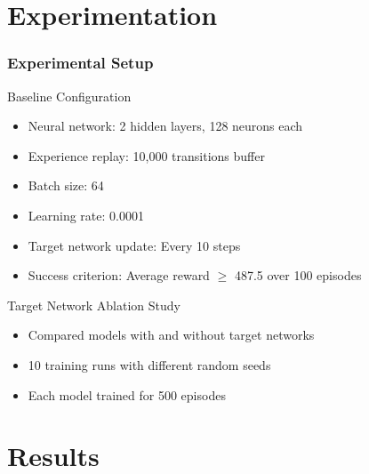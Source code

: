 \documentclass[
    9pt,
    aspectratio=169,
]{beamer}
\begin{document}
\section{Experimentation}

\begin{frame}
\frametitle{Experimental Setup}
\begin{block}{Baseline Configuration}
    \begin{itemize}
        \item Neural network: 2 hidden layers, 128 neurons each
        \item Experience replay: 10,000 transitions buffer
        \item Batch size: 64
        \item Learning rate: 0.0001
        \item Target network update: Every 10 steps
        \item Success criterion: Average reward $\geq$ 487.5 over 100 episodes
    \end{itemize}
\end{block}

\begin{block}{Target Network Ablation Study}
    \begin{itemize}
        \item Compared models with and without target networks
        \item 10 training runs with different random seeds
        \item Each model trained for 500 episodes
    \end{itemize}
\end{block}
\end{frame}

\section{Results}
\end{document}
